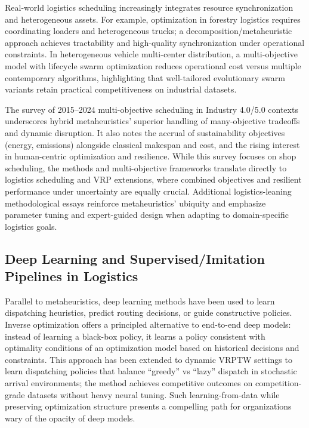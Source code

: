Real-world logistics scheduling increasingly integrates resource synchronization and heterogeneous assets. For example, optimization in forestry logistics requires coordinating loaders and heterogeneous trucks; a decomposition/metaheuristic approach achieves tractability and high-quality synchronization under operational constraints. In heterogeneous vehicle multi-center distribution, a multi-objective model with lifecycle swarm optimization reduces operational cost versus multiple contemporary algorithms, highlighting that well-tailored evolutionary swarm variants retain practical competitiveness on industrial datasets.​

The survey of 2015–2024 multi-objective scheduling in Industry 4.0/5.0 contexts underscores hybrid metaheuristics’ superior handling of many-objective tradeoffs and dynamic disruption. It also notes the accrual of sustainability objectives (energy, emissions) alongside classical makespan and cost, and the rising interest in human-centric optimization and resilience. While this survey focuses on shop scheduling, the methods and multi-objective frameworks translate directly to logistics scheduling and VRP extensions, where combined objectives and resilient performance under uncertainty are equally crucial. Additional logistics-leaning methodological essays reinforce metaheuristics’ ubiquity and emphasize parameter tuning and expert-guided design when adapting to domain-specific logistics goals.​

\subsection{Deep Learning and Supervised/Imitation Pipelines in Logistics}
Parallel to metaheuristics, deep learning methods have been used to learn dispatching heuristics, predict routing decisions, or guide constructive policies. Inverse optimization offers a principled alternative to end-to-end deep models: instead of learning a black-box policy, it learns a policy consistent with optimality conditions of an optimization model based on historical decisions and constraints. This approach has been extended to dynamic VRPTW settings to learn dispatching policies that balance “greedy” vs “lazy” dispatch in stochastic arrival environments; the method achieves competitive outcomes on competition-grade datasets without heavy neural tuning. Such learning-from-data while preserving optimization structure presents a compelling path for organizations wary of the opacity of deep models.​

